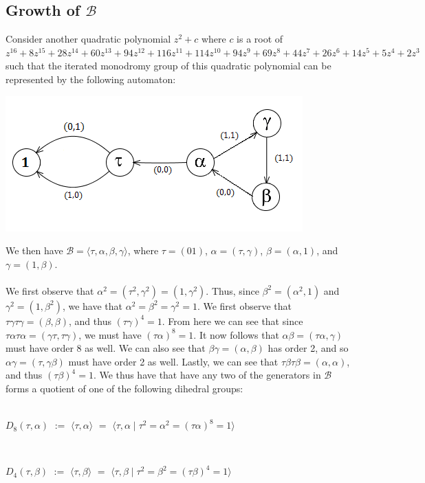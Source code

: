 \documentclass[11pt]{amsart}
\theoremstyle{definition}
\theoremstyle{remark}
\numberwithin{equation}{section}
\begin{document}
\subsection{Growth of $\mathcal{B}$}
Consider another quadratic polynomial $z^2 + c$ where $c$ is a root of $z^{16} + 8z^{15} + 28z^{14} +60z^{13} + 94z^{12} + 116z^{11} + 114z^{10} + 94z^{9} + 69z^{8} + 44z^{7} + 26z^{6} +14z^{5} + 5z^{4} + 2z^{3}$ such that the iterated monodromy group of this quadratic polynomial can be represented by the following automaton:
\centerline{\includegraphics{groupBauto.png}}
We then have $\mathcal{B} = \langle \tau, \alpha, \beta, \gamma \rangle$, where $\tau= (01)$, $\alpha = (\tau,\gamma)$, $\beta = (\alpha, 1)$, and $\gamma = (1, \beta)$. \\ \\
We first observe that $\alpha^{2} = (\tau^{2}, \gamma^{2}) = (1, \gamma^{2})$. Thus, since $\beta^{2} = (\alpha^{2}, 1)$ and $\gamma^{2} = (1, \beta^{2})$, we have that $\alpha^{2} = \beta^{2} = \gamma^{2} = 1$. We first observe that $\tau \gamma \tau \gamma = (\beta, \beta)$, and thus $ (\tau \gamma)^{4} = 1$. From here we can see that since $\tau \alpha \tau \alpha = (\gamma \tau, \tau \gamma)$, we must have $(\tau \alpha)^{8} = 1$.  It now follows that $ \alpha \beta = ( \tau \alpha, \gamma)$ must have order 8 as well. We can also see that $ \beta \gamma = ( \alpha, \beta)$ has order 2, and so $\alpha \gamma = (\tau, \gamma \beta)$ must have order 2 as well. Lastly, we can see that $\tau \beta \tau \beta = (\alpha, \alpha)$, and thus $(\tau \beta)^{4} = 1$. We thus have that have any two of the generators in $\mathcal{B}$ forms a quotient of one of the following dihedral groups: \\ \\
\centerline{$D_{8}(\tau, \alpha)$ $:=$ $\langle \tau, \alpha \rangle$ $=$ $\langle \tau, \alpha \mid \tau^{2} = \alpha^{2} = (\tau\alpha)^{8} = 1 \rangle$} \\
\centerline{$D_{4}(\tau, \beta)$ $:=$ $\langle \tau, \beta \rangle$ $=$ $\langle \tau, \beta \mid \tau^{2} = \beta^{2} = (\tau\beta)^{4} = 1 \rangle$} \\ 
\end{document}
